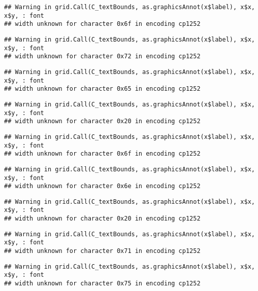 \documentclass[
]{article}
\begin{document}
\begin{verbatim}
## Warning in grid.Call(C_textBounds, as.graphicsAnnot(x$label), x$x, x$y, : font
## width unknown for character 0x6f in encoding cp1252
\end{verbatim}

\begin{verbatim}
## Warning in grid.Call(C_textBounds, as.graphicsAnnot(x$label), x$x, x$y, : font
## width unknown for character 0x72 in encoding cp1252
\end{verbatim}

\begin{verbatim}
## Warning in grid.Call(C_textBounds, as.graphicsAnnot(x$label), x$x, x$y, : font
## width unknown for character 0x65 in encoding cp1252
\end{verbatim}

\begin{verbatim}
## Warning in grid.Call(C_textBounds, as.graphicsAnnot(x$label), x$x, x$y, : font
## width unknown for character 0x20 in encoding cp1252
\end{verbatim}

\begin{verbatim}
## Warning in grid.Call(C_textBounds, as.graphicsAnnot(x$label), x$x, x$y, : font
## width unknown for character 0x6f in encoding cp1252
\end{verbatim}

\begin{verbatim}
## Warning in grid.Call(C_textBounds, as.graphicsAnnot(x$label), x$x, x$y, : font
## width unknown for character 0x6e in encoding cp1252
\end{verbatim}

\begin{verbatim}
## Warning in grid.Call(C_textBounds, as.graphicsAnnot(x$label), x$x, x$y, : font
## width unknown for character 0x20 in encoding cp1252
\end{verbatim}

\begin{verbatim}
## Warning in grid.Call(C_textBounds, as.graphicsAnnot(x$label), x$x, x$y, : font
## width unknown for character 0x71 in encoding cp1252
\end{verbatim}

\begin{verbatim}
## Warning in grid.Call(C_textBounds, as.graphicsAnnot(x$label), x$x, x$y, : font
## width unknown for character 0x75 in encoding cp1252
\end{verbatim}
\end{document}
